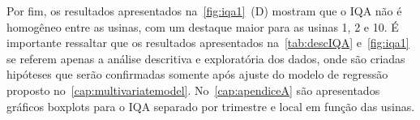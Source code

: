 Por fim, os resultados apresentados na~\autoref{fig:iqa1}~(D) mostram
que o IQA não é homogêneo entre as usinas, com um destaque maior para as
usinas 1, 2 e 10. É importante ressaltar que os resultados apresentados
na~\autoref{tab:descIQA} e~\autoref{fig:iqa1} se referem apenas a
análise descritiva e exploratória dos dados, onde são criadas hipóteses
que serão confirmadas somente após ajuste do modelo de regressão
proposto no~\autoref{cap:multivariatemodel}. No~\autoref{cap:apendiceA}
são apresentados gráficos boxplots para o IQA separado por trimestre e
local em função das usinas.

